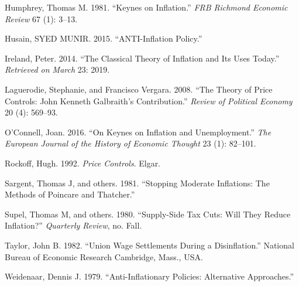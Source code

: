 \documentclass[
]{article}
\begin{document}
\leavevmode\hypertarget{ref-humphrey1981keynes}{}%
Humphrey, Thomas M. 1981. ``Keynes on Inflation.'' \emph{FRB Richmond
Economic Review} 67 (1): 3--13.

\leavevmode\hypertarget{ref-husainanti}{}%
Husain, SYED MUNIR. 2015. ``ANTI-Inflation Policy.''

\leavevmode\hypertarget{ref-ireland2014classical}{}%
Ireland, Peter. 2014. ``The Classical Theory of Inflation and Its Uses
Today.'' \emph{Retrieved on March} 23: 2019.

\leavevmode\hypertarget{ref-laguerodie2008theory}{}%
Laguerodie, Stephanie, and Francisco Vergara. 2008. ``The Theory of
Price Controls: John Kenneth Galbraith's Contribution.'' \emph{Review of
Political Economy} 20 (4): 569--93.

\leavevmode\hypertarget{ref-o2016keynes}{}%
O'Connell, Joan. 2016. ``On Keynes on Inflation and Unemployment.''
\emph{The European Journal of the History of Economic Thought} 23 (1):
82--101.

\leavevmode\hypertarget{ref-rockoff1992price}{}%
Rockoff, Hugh. 1992. \emph{Price Controls}. Elgar.

\leavevmode\hypertarget{ref-sargent1981stopping}{}%
Sargent, Thomas J, and others. 1981. ``Stopping Moderate Inflations: The
Methods of Poincare and Thatcher.''

\leavevmode\hypertarget{ref-supel1980supply}{}%
Supel, Thomas M, and others. 1980. ``Supply-Side Tax Cuts: Will They
Reduce Inflation?'' \emph{Quarterly Review}, no. Fall.

\leavevmode\hypertarget{ref-taylor1982union}{}%
Taylor, John B. 1982. ``Union Wage Settlements During a Disinflation.''
National Bureau of Economic Research Cambridge, Mass., USA.

\leavevmode\hypertarget{ref-weidenaar1979anti}{}%
Weidenaar, Dennis J. 1979. ``Anti-Inflationary Policies: Alternative
Approaches.''
\end{document}
